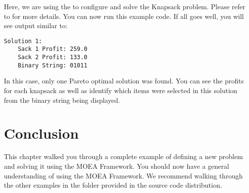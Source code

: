 Here, we are using the  to configure and solve the Knapsack problem.  Please refer to  for more details.  You can now run this example code.  If all goes well, you will see output similar to:

\begin{lstlisting}[language=plaintext]
Solution 1:
    Sack 1 Profit: 259.0
    Sack 2 Profit: 133.0
    Binary String: 01011
\end{lstlisting}

In this case, only one Pareto optimal solution was found.  You can see the profits for each knapsack as well as identify which items were selected in this solution from the binary string being displayed.

\section{Conclusion}
This chapter walked you through a complete example of defining a new problem and solving it using the MOEA Framework.  You should now have a general understanding of using the MOEA Framework.  We recommend walking through the other examples in the  folder provided in the source code distribution.